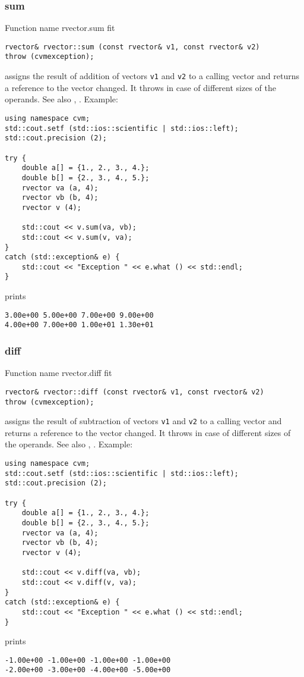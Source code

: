 \subsubsection{sum}
Function%
\pdfdest name {rvector.sum} fit
\begin{verbatim}
rvector& rvector::sum (const rvector& v1, const rvector& v2)
throw (cvmexception);
\end{verbatim}
assigns the result of addition of
vectors \verb"v1" and \verb"v2"  to a calling vector
and returns a reference to
the vector changed.
It throws  
in case of different sizes of the operands.
See also ,
.
Example:
\begin{Verbatim}
using namespace cvm;
std::cout.setf (std::ios::scientific | std::ios::left); 
std::cout.precision (2);

try {
    double a[] = {1., 2., 3., 4.};
    double b[] = {2., 3., 4., 5.};
    rvector va (a, 4);
    rvector vb (b, 4);
    rvector v (4);

    std::cout << v.sum(va, vb);
    std::cout << v.sum(v, va);
}
catch (std::exception& e) {
    std::cout << "Exception " << e.what () << std::endl;
}
\end{Verbatim}
prints
\begin{Verbatim}
3.00e+00 5.00e+00 7.00e+00 9.00e+00
4.00e+00 7.00e+00 1.00e+01 1.30e+01
\end{Verbatim}
\newpage


\subsubsection{diff}
Function%
\pdfdest name {rvector.diff} fit
\begin{verbatim}
rvector& rvector::diff (const rvector& v1, const rvector& v2)
throw (cvmexception);
\end{verbatim}
assigns the result of subtraction of
vectors \verb"v1" and \verb"v2" to a calling vector
and returns a reference to
the vector changed.
It throws  
in case of different sizes of the operands.
See also ,
.
Example:
\begin{Verbatim}
using namespace cvm;
std::cout.setf (std::ios::scientific | std::ios::left); 
std::cout.precision (2);

try {
    double a[] = {1., 2., 3., 4.};
    double b[] = {2., 3., 4., 5.};
    rvector va (a, 4);
    rvector vb (b, 4);
    rvector v (4);

    std::cout << v.diff(va, vb);
    std::cout << v.diff(v, va);
}
catch (std::exception& e) {
    std::cout << "Exception " << e.what () << std::endl;
}
\end{Verbatim}
prints
\begin{Verbatim}
-1.00e+00 -1.00e+00 -1.00e+00 -1.00e+00
-2.00e+00 -3.00e+00 -4.00e+00 -5.00e+00
\end{Verbatim}
\newpage



